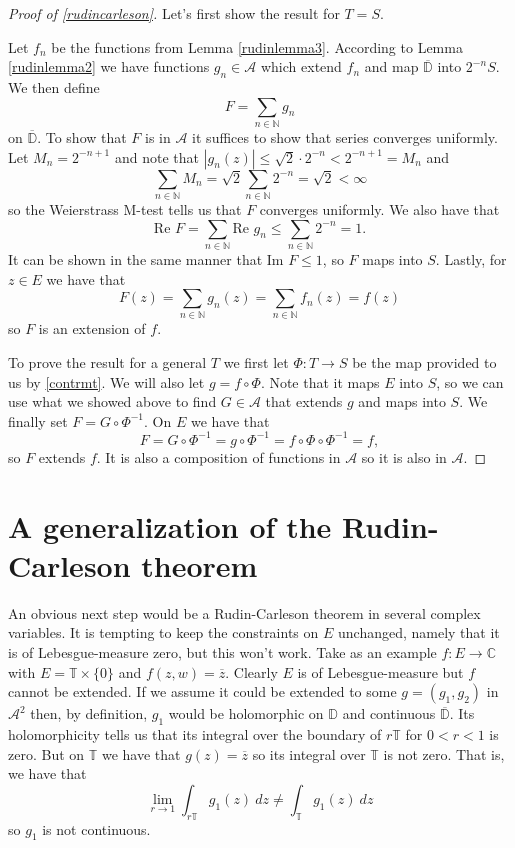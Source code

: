 \documentclass[a4paper,12pt,twoside,BCOR=10mm]{scrbook}
\theoremstyle{definition}
\theoremstyle{definition}
\theoremstyle{definition}
\renewcommand{\Re}{\text{Re }}
\renewcommand{\Im}{\text{Im }}
\begin{document}
\begin{proof}[Proof of \ref{rudincarleson}]
Let's first show the result for $T = S$.

Let $f_n$ be the functions from Lemma \ref{rudinlemma3}.
According to Lemma \ref{rudinlemma2} we have functions $g_n \in \mathcal{A}$ which extend $f_n$ and map $\overline{\mathbb{D}}$ into $2^{-n}S$.
We then define
\[
	F = \sum_{n \in \mathbb{N}} g_n
\]
on $\overline{\mathbb{D}}$.
To show that $F$ is in $\mathcal{A}$ it suffices to show that series converges uniformly.
Let $M_n = 2^{-n + 1}$ and note that $|g_n(z)| \leq \sqrt{2}\cdot 2^{-n} < 2^{-n + 1} = M_n$ and
\[
	\sum_{n \in \mathbb{N}} M_n
	=
	\sqrt{2}\sum_{n \in \mathbb{N}} 2^{-n} =
	\sqrt{2} < \infty
\]
so the Weierstrass M-test tells us that $F$ converges uniformly.
We also have that
\[
	\Re F = \sum_{n \in \mathbb{N}} \Re g_n \leq \sum_{n \in \mathbb{N}} 2^{-n} = 1.
\]
It can be shown in the same manner that $\Im F \leq 1$, so $F$ maps into $S$.
Lastly, for $z \in E$ we have that
\[
	F(z) = \sum_{n \in \mathbb{N}} g_n(z) = \sum_{n \in \mathbb{N}} f_n(z) = f(z)
\]
so $F$ is an extension of $f$.

To prove the result for a general $T$ we first let $\Phi: T \rightarrow S$ be the map provided to us by \ref{contrmt}.
We will also let $g = f \circ \Phi$.
Note that it maps $E$ into $S$, so we can use what we showed above to find $G \in \mathcal{A}$ that extends $g$ and maps into $S$.
We finally set $F = G \circ \Phi^{-1}$.
On $E$ we have that
\[
	F = G \circ \Phi^{-1} = g \circ \Phi^{-1} = f \circ \Phi \circ \Phi^{-1} = f,
\]
so $F$ extends $f$.
It is also a composition of functions in $\mathcal{A}$ so it is also in $\mathcal{A}$.
\end{proof}



\section{A generalization of the Rudin-Carleson theorem}
\label{section3}
An obvious next step would be a Rudin-Carleson theorem in several complex variables.
It is tempting to keep the constraints on $E$ unchanged, namely that it is of Lebesgue-measure zero, but this won't work.
Take as an example $f: E \rightarrow \mathbb{C}$ with $E = \mathbb{T} \times \{0\}$ and $f(z, w) = \overline{z}$.
Clearly $E$ is of Lebesgue-measure but $f$ cannot be extended.
If we assume it could be extended to some $g = (g_1, g_2)$ in $\mathcal{A}^2$ then, by definition, $g_1$ would be holomorphic on $\mathbb{D}$ and continuous $\overline{\mathbb{D}}$.
Its holomorphicity tells us that its integral over the boundary of $r\mathbb{T}$ for $0 < r < 1$ is zero.
But on $\mathbb{T}$ we have that $g(z) = \overline{z}$ so its integral over $\mathbb{T}$ is not zero.
That is, we have that
\[
	\lim_{r \rightarrow 1} \int_{r\mathbb{T}} g_1(z)\ dz \neq \int_{\mathbb{T}} g_1(z)\ dz
\]
so $g_1$ is not continuous.
\end{document}

